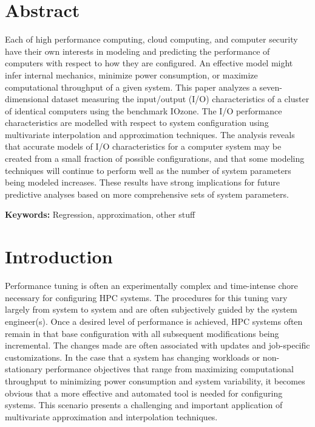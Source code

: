\documentclass{scspaperproc}
\theoremstyle{scsthe}
\begin{document}
\maketitle

\section*{Abstract}

Each of high performance computing, cloud computing, and computer
security have their own interests in modeling and predicting the
performance of computers with respect to how they are configured. An
effective model might infer internal mechanics, minimize power
consumption, or maximize computational throughput of a given
system. This paper analyzes a seven-dimensional dataset measuring the
input/output (I/O) characteristics of a cluster of identical computers
using the benchmark IOzone. The I/O performance characteristics are
modelled with respect to system configuration using multivariate
interpolation and approximation techniques. The analysis reveals that
accurate models of I/O characteristics for a computer system may be
created from a small fraction of possible configurations, and that
some modeling techniques will continue to perform well as the number
of system parameters being modeled increases. These results have
strong implications for future predictive analyses based on more
comprehensive sets of system parameters.

\textbf{Keywords:} Regression, approximation, other stuff


\section{Introduction}

Performance tuning is often an experimentally complex and time-intense
chore necessary for configuring HPC systems. The procedures for this
tuning vary largely from system to system and are often subjectively
guided by the system engineer(s). Once a desired level of performance
is achieved, HPC systems often remain in that base configuration with
all subsequent modifications being incremental. The changes made are
often associated with updates and job-specific customizations. In the
case that a system has changing workloads or non-stationary
performance objectives that range from maximizing computational
throughput to minimizing power consumption and system variability, it
becomes obvious that a more effective and automated tool is needed for
configuring systems. This scenario presents a challenging and
important application of multivariate approximation and interpolation
techniques.
\end{document}
